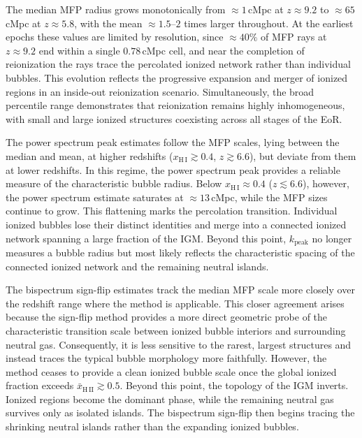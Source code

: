 \documentclass[apj,twocolumn, appendixfloats, twocolappendix, numberedappendix, tighten]{openjournal}
\begin{document}
The median MFP radius grows monotonically from $\approx 1$\,cMpc at $z \approx 9.2$ to $\approx 65$\,cMpc at $z \approx 5.8$, with the mean $\approx 1.5$--$2$ times larger throughout. At the earliest epochs these values are limited by resolution, since $\approx 40\%$ of MFP rays at $z \approx 9.2$ end within a single $0.78$\,cMpc cell, and near the completion of reionization the rays trace the percolated ionized network rather than individual bubbles. This evolution reflects the progressive expansion and merger of ionized regions in an inside-out reionization scenario. Simultaneously, the broad percentile range demonstrates that reionization remains highly inhomogeneous, with small and large ionized structures coexisting across all stages of the EoR.


The power spectrum peak estimates follow the MFP scales, lying between the median and mean, at higher redshifts ($x_\mathrm{H\,I} \gtrsim 0.4$, $z \gtrsim 6.6$), but deviate from them at lower redshifts. In this regime, the power spectrum peak provides a reliable measure of the characteristic bubble radius. Below $x_\mathrm{H\,I} \approx 0.4$ ($z \lesssim 6.6$), however, the power spectrum estimate saturates at $\approx 13$\,cMpc, while the MFP sizes continue to grow. This flattening marks the percolation transition. Individual ionized bubbles lose their distinct identities and merge into a connected ionized network spanning a large fraction of the IGM. Beyond this point, $k_\mathrm{peak}$ no longer measures a bubble radius but most likely reflects the characteristic spacing of the connected ionized network and the remaining neutral islands.


The bispectrum sign-flip estimates track the median MFP scale more closely over the redshift range where the method is applicable. This closer agreement arises because the sign-flip method provides a more direct geometric probe of the characteristic transition scale between ionized bubble interiors and surrounding neutral gas. Consequently, it is less sensitive to the rarest, largest structures and instead traces the typical bubble morphology more faithfully. However, the method ceases to provide a clean ionized bubble scale once the global ionized fraction exceeds $\bar{x}_{\mathrm{H \,II}} \gtrsim 0.5$. Beyond this point, the topology of the IGM inverts. Ionized regions become the dominant phase, while the remaining neutral gas survives only as isolated islands. The bispectrum sign-flip then begins tracing the shrinking neutral islands rather than the expanding ionized bubbles.
\end{document}
